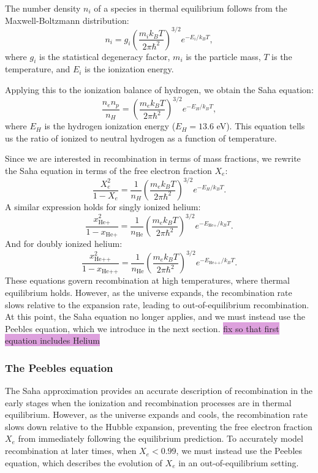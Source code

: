 \documentclass{aa}
\begin{document}
The number density $n_i$ of a species in thermal equilibrium follows from the Maxwell-Boltzmann distribution:
\begin{equation}
n_i = g_i \left( \frac{m_i k_B T}{2\pi \hbar^2} \right)^{3/2} e^{-E_i / k_B T},
\end{equation}
where $g_i$ is the statistical degeneracy factor, $m_i$ is the particle mass, $T$ is the temperature, and $E_i$ is the ionization energy.

Applying this to the ionization balance of hydrogen, we obtain the Saha equation:
\begin{equation}
\frac{n_e n_p}{n_H} = \left( \frac{m_e k_B T}{2\pi \hbar^2} \right)^{3/2} e^{-E_H / k_B T},
\end{equation}
where $E_H$ is the hydrogen ionization energy ($E_H = 13.6$ eV). This equation tells us the ratio of ionized to neutral hydrogen as a function of temperature.

Since we are interested in recombination in terms of mass fractions, we rewrite the Saha equation in terms of the free electron fraction $X_e$:
\begin{equation}
\frac{X_e^2}{1 - X_e} = \frac{1}{n_H} \left( \frac{m_e k_B T}{2\pi \hbar^2} \right)^{3/2} e^{-E_H / k_B T}.
\end{equation}
A similar expression holds for singly ionized helium:
\begin{equation}
\frac{x_{\text{He+}}^2}{1 - x_{\text{He+}}} = \frac{1}{n_{\text{He}}} \left( \frac{m_e k_B T}{2\pi \hbar^2} \right)^{3/2} e^{-E_{\text{He+}} / k_B T}.
\end{equation}
And for doubly ionized helium:
\begin{equation}
\frac{x_{\text{He++}}^2}{1 - x_{\text{He++}}} = \frac{1}{n_{\text{He}}} \left( \frac{m_e k_B T}{2\pi \hbar^2} \right)^{3/2} e^{-E_{\text{He++}} / k_B T}.
\end{equation}
These equations govern recombination at high temperatures, where thermal equilibrium holds. However, as the universe expands, the recombination rate slows relative to the expansion rate, leading to out-of-equilibrium recombination. At this point, the Saha equation no longer applies, and we must instead use the Peebles equation, which we introduce in the next section.
\color{black}
\colorbox{Plum}{fix so that first equation includes Helium}








\subsubsection{The Peebles equation}
\color{Plum}
The Saha approximation provides an accurate description of recombination in the early stages when the ionization and recombination processes are in thermal equilibrium. However, as the universe expands and cools, the recombination rate slows down relative to the Hubble expansion, preventing the free electron fraction $X_e$ from immediately following the equilibrium prediction. To accurately model recombination at later times, when $X_e < 0.99$, we must instead use the Peebles equation, which describes the evolution of $X_e$ in an out-of-equilibrium setting.
\end{document}
